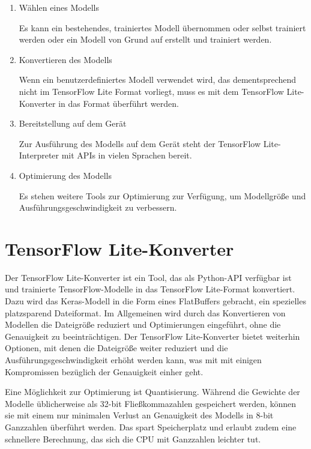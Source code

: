 \begin{enumerate}
  \item Wählen eines Modells
 
      Es kann ein bestehendes, trainiertes Modell übernommen oder selbst trainiert werden oder ein Modell von Grund auf erstellt und trainiert werden.
  \item Konvertieren des Modells

        Wenn ein benutzerdefiniertes Modell verwendet wird, das dementsprechend nicht im TensorFlow Lite Format vorliegt, muss es mit dem  TensorFlow Lite-Konverter in das Format überführt werden.
  \item Bereitstellung auf dem Gerät
  
        Zur Ausführung des Modells auf dem Gerät steht der TensorFlow Lite-Interpreter mit APIs in vielen Sprachen bereit.

 \item Optimierung des Modells
 
       Es stehen weitere Tools zur Optimierung zur Verfügung, um Modellgröße und Ausführungsgeschwindigkeit zu verbessern.
\end{enumerate}

\section{TensorFlow Lite-Konverter}

Der TensorFlow Lite-Konverter ist ein Tool, das als Python-API verfügbar ist und trainierte TensorFlow-Modelle in das TensorFlow Lite-Format konvertiert. 
Dazu wird das Keras-Modell in die Form eines FlatBuffers gebracht, ein spezielles platzsparend Dateiformat. Im Allgemeinen wird durch das Konvertieren von Modellen 
die Dateigröße reduziert und Optimierungen eingeführt, ohne die Genauigkeit zu beeinträchtigen. Der TensorFlow Lite-Konverter bietet weiterhin Optionen, mit denen 
die Dateigröße weiter reduziert und die Ausführungsgeschwindigkeit erhöht werden kann, 
was mit mit einigen Kompromissen bezüglich der Genauigkeit einher geht. \cite{Google.09.10.2020}\cite{Warden:2020}

Eine Möglichkeit zur Optimierung ist Quantisierung. Während die Gewichte der Modelle üblicherweise als 32-bit Fließkommazahlen gespeichert werden, 
können sie mit einem nur minimalen Verlust an Genauigkeit des Modells in 8-bit Ganzzahlen überführt werden. Das spart Speicherplatz und erlaubt zudem
eine schnellere Berechnung, das sich die CPU mit Ganzzahlen leichter tut. \cite{Warden:2020}

